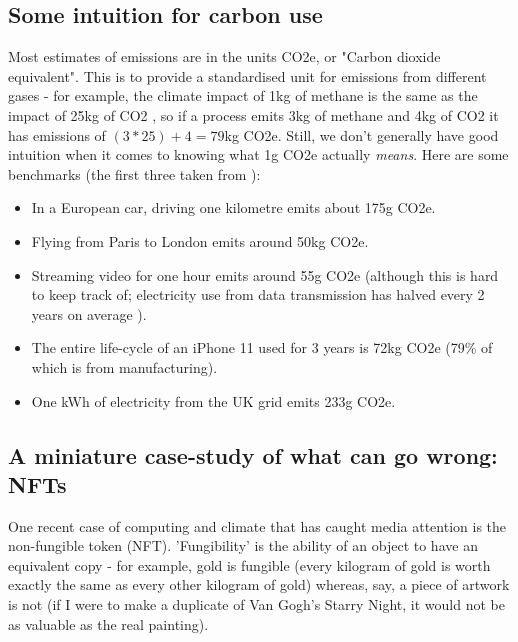 \documentclass{article}
\begin{document}
\subsection{Some intuition for carbon use}
Most estimates of emissions are in the units CO2e, or "Carbon dioxide equivalent". This is to provide a standardised unit for emissions from different gases - for example, the climate impact of 1kg of methane is the same as the impact of 25kg of CO2 \citep{forster2007changes}, so if a process emits 3kg of methane and 4kg of CO2 it has emissions of $(3*25)+4=79$kg CO2e. Still, we don't generally have good intuition when it comes to knowing what 1g CO2e actually \emph{means}. Here are some benchmarks (the first three taken from \citet{lannelongue2021ten}):
\begin{itemize}
\item In a European car, driving one kilometre emits about 175g CO2e.
\item Flying from Paris to London emits around 50kg CO2e.
\item Streaming video for one hour emits around 55g CO2e (although this is hard to keep track of; electricity use from data transmission has halved every 2 years on average \citep{aslan2018electricity}).
\item The entire life-cycle of an iPhone 11 used for 3 years is 72kg CO2e (79\% of which is from manufacturing). \citep{apple2019product}
\item One kWh of electricity from the UK grid emits 233g CO2e. \citep{uk2020greenhouse}
\end{itemize}


\subsection{A miniature case-study of what can go wrong: NFTs}
One recent case of computing and climate that has caught media attention is the non-fungible token (NFT). 'Fungibility' is the ability of an object to have an equivalent copy - for example, gold is fungible (every kilogram of gold is worth exactly the same as every other kilogram of gold) whereas, say, a piece of artwork is not (if I were to make a duplicate of Van Gogh's Starry Night, it would not be as valuable as the real painting). \newline
\end{document}

